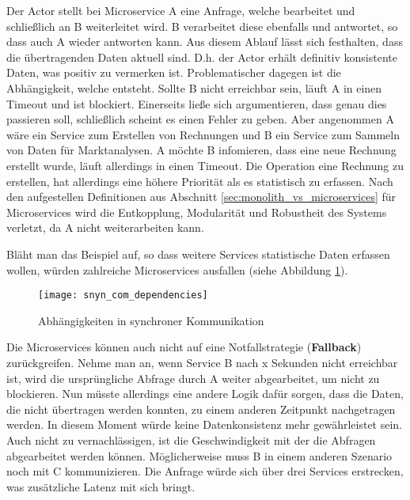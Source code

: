 Der Actor stellt bei Microservice A eine Anfrage, welche bearbeitet und schließlich an B weiterleitet wird. B verarbeitet diese ebenfalls und antwortet, so dass auch A wieder antworten kann. Aus diesem Ablauf lässt sich festhalten, dass die übertragenden Daten aktuell sind. D.h. der Actor erhält definitiv konsistente Daten, was positiv zu vermerken ist. Problematischer dagegen ist die Abhängigkeit, welche entsteht. Sollte B nicht erreichbar sein, läuft A in einen Timeout und ist blockiert. Einerseits ließe sich argumentieren, dass genau dies passieren soll, schließlich scheint es einen Fehler zu geben. Aber angenommen A wäre ein Service zum Erstellen von Rechnungen und B ein Service zum Sammeln von Daten für Marktanalysen. A möchte B infomieren, dass eine neue Rechnung erstellt wurde, läuft allerdings in einen Timeout. Die Operation eine Rechnung zu erstellen, hat allerdings eine höhere Priorität als es statistisch zu erfassen. Nach den aufgestellen Definitionen aus Abschnitt \ref{sec:monolith_vs_microservices} für Microservices wird die Entkopplung, Modularität und Robustheit des Systems verletzt, da A nicht weiterarbeiten kann.\cite{wolff2018mic_praxis} \cite{bruce2019mic_in_action}  

Bläht man das Beispiel auf, so dass weitere Services statistische Daten erfassen wollen, würden zahlreiche Microservices ausfallen (siehe Abbildung \ref{fig:snyn_com_dependencies}). \\

\begin{figure}[ht]
	\centering
	\texttt{[image: snyn\_com\_dependencies]}
	\caption[Abhängigkeiten in synchroner Kommunikation] { Abhängigkeiten in synchroner Kommunikation}
	\label{fig:snyn_com_dependencies}
\end{figure}

Die Microservices können auch nicht auf eine Notfallstrategie (\textbf{Fallback}) zurückgreifen. Nehme man an, wenn Service B nach x Sekunden nicht erreichbar ist, wird die ursprüngliche Abfrage durch A weiter abgearbeitet, um nicht zu blockieren. Nun müsste allerdings eine andere Logik dafür sorgen, dass die Daten, die nicht übertragen werden konnten, zu einem anderen Zeitpunkt nachgetragen werden. In diesem Moment würde keine Datenkonsistenz mehr gewährleistet sein. \\

Auch nicht zu vernachlässigen, ist die Geschwindigkeit mit der die Abfragen abgearbeitet werden können. Möglicherweise muss B in einem anderen Szenario noch mit C kommunizieren. Die Anfrage würde sich über drei Services erstrecken, was zusätzliche Latenz mit sich bringt.\cite{wolff2018mic_praxis} \\   


